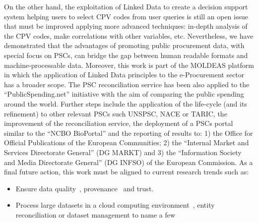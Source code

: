 \documentclass[preprint,12pt]{elsarticle}
\begin{document}
On the other hand, the exploitation of Linked Data to create a decision support system helping users to select CPV codes 
from user queries is still an open issue that must be improved applying more advanced techniques: in-depth analysis of the CPV codes, 
make correlations with other variables, etc. Nevertheless, we have demonstrated that the advantages of promoting public procurement 
data, with special focus on PSCs, can bridge the gap between human readable formats and machine-processable data. Moreover, 
this work is part of the MOLDEAS platform in which the application of Linked Data principles to the e-Procurement sector has a 
broader scope. The PSC reconciliation service has been also applied to the ``PublicSpending.net'' initiative with the aim 
of comparing the public spending around the world. Further steps include the application of the life-cycle (and its refinement) 
to other relevant PSCs such UNSPSC, NACE or TARIC, the improvement of the reconciliation service, the deployment of 
a PSCs portal similar to the ``NCBO BioPortal'' and the reporting of results to: 1) the Office for Official Publications 
of the European Communities; 2) the ``Internal Market and Services Directorate General'' (DG MARKT) and 3) the ``Information
Society and Media Directorate General'' (DG INFSO) of the European Commission. As a final future action, 
this work must be aligned to current research trends such as: 

\begin{itemize}
 \item Ensure data quality~\cite{lodq}, provenance~\cite{DBLP:conf/ipaw/HartigZ10} and trust.
 \item Process large datasets in a cloud computing environment~\cite{DBLP:conf/closer/HausenblasGHC12},
 entity reconciliation or dataset management to name a few
\end{itemize}




\end{document}
